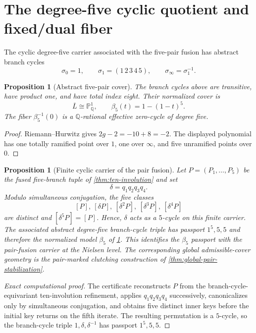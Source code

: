 \documentclass[11pt]{article}
\newtheorem{proposition}[theorem]{Proposition}
\theoremstyle{remark}
\newcommand{\Q}{\mathbb Q}
\newcommand{\Pone}{\mathbb P^1}
\begin{document}
\section{The degree-five cyclic quotient and fixed/dual fiber}\label{sec:beta5}

The cyclic degree-five carrier associated with the five-pair fusion has abstract branch cycles
\[
 \sigma_0=1,
 \qquad
 \sigma_1=(1\,2\,3\,4\,5),
 \qquad
 \sigma_\infty=\sigma_1^{-1}.
\]

\begin{proposition}[Abstract five-pair cover]\label{prop:beta5}
The branch cycles above are transitive, have product one, and have total index eight.  Their normalized cover is
\[
 \overline L\cong\Pone_{\Q},
 \qquad
 \boxed{\beta_5(t)=1-(1-t)^5}.
\]
The fiber $\beta_5^{-1}(0)$ is a $\Q$-rational effective zero-cycle of degree five.
\end{proposition}

\begin{proof}
Riemann--Hurwitz gives $2g-2=-10+8=-2$.  The displayed polynomial has one totally ramified point over $1$, one over $\infty$, and five unramified points over $0$.
\end{proof}

\begin{proposition}[Finite cyclic carrier of the pair fusion]\label{prop:beta5-finite-carrier}
Let $P=(P_1,\ldots,P_5)$ be the fused five-branch tuple of \cref{thm:ten-involution} and set
\[
 \delta=q_1q_2q_3q_4.
\]
Modulo simultaneous conjugation, the five classes
\[
 [P],\ [\delta P],\ [\delta^2P],\ [\delta^3P],\ [\delta^4P]
\]
are distinct and $[\delta^5P]=[P]$.  Hence, $\delta$ acts as a $5$-cycle on this finite carrier.  The associated abstract degree-five branch-cycle triple has passport $1^5,5,5$ and therefore the normalized model $\beta_5$ of \cref{prop:beta5}.  This identifies the $\beta_5$ passport with the pair-fusion carrier at the Nielsen level.  The corresponding global admissible-cover geometry is the pair-marked clutching construction of \cref{thm:global-pair-stabilization}.
\end{proposition}

\begin{proof}[Exact computational proof]
The certificate reconstructs $P$ from the branch-cycle-equivariant ten-involution refinement, applies $q_1q_2q_3q_4$ successively, canonicalizes only by simultaneous conjugation, and obtains five distinct inner keys before the initial key returns on the fifth iterate.  The resulting permutation is a $5$-cycle, so the branch-cycle triple $1,\delta,\delta^{-1}$ has passport $1^5,5,5$.
\end{proof}
\end{document}
